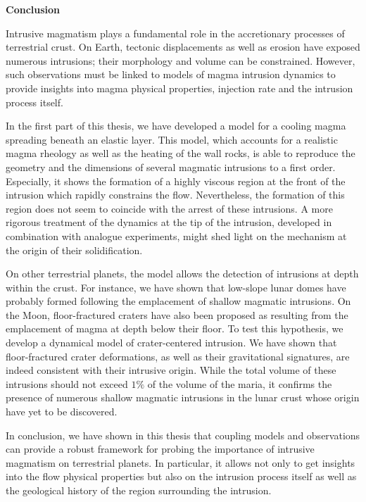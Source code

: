 \thispagestyle{plain}
\begin{center}
 \Large \vspace{.5cm} \textbf{Conclusion}
\end{center}

Intrusive  magmatism  plays a  fundamental  role  in the  accretionary
processes of  terrestrial crust.  On Earth,  tectonic displacements as
well as erosion have exposed numerous intrusions; their morphology and
volume can be constrained.  However,  such observations must be linked
to models of  magma intrusion dynamics to provide  insights into magma
physical properties, injection rate and the intrusion process itself.

In the  first part  of this thesis,  we have developed  a model  for a
cooling magma spreading  beneath an elastic layer.   This model, which
accounts for a realistic magma rheology  as well as the heating of the
wall rocks,  is able to reproduce  the geometry and the  dimensions of
several magmatic  intrusions to a  first order.  Especially,  it shows
the formation of a highly viscous region at the front of the intrusion
which  rapidly constrains  the flow.   Nevertheless, the  formation of
this  region does  not  seem  to coincide  with  the  arrest of  these
intrusions.  A more  rigorous treatment of the dynamics at  the tip of
the  intrusion, developed  in combination  with analogue  experiments,
might  shed   light  on   the  mechanism  at   the  origin   of  their
solidification.

On  other  terrestrial planets,  the  model  allows the  detection  of
intrusions at  depth within  the crust.  For  instance, we  have shown
that  low-slope  lunar  domes   have  probably  formed  following  the
emplacement   of   shallow   magmatic  intrusions.    On   the   Moon,
floor-fractured craters have also been  proposed as resulting from the
emplacement  of  magma at  depth  below  their  floor.  To  test  this
hypothesis, we develop a dynamical model of crater-centered intrusion.
We have  shown that  floor-fractured crater  deformations, as  well as
their  gravitational  signatures,  are indeed  consistent  with  their
intrusive origin.  While  the total volume of  these intrusions should
not exceed $1\%$ of the volume  of the maria, it confirms the presence
of  numerous shallow  magmatic  intrusions in  the  lunar crust  whose
origin have yet to be discovered.

In conclusion, we  have shown in this thesis that  coupling models and
observations can provide a robust framework for probing the importance
of  intrusive magmatism  on  terrestrial planets.   In particular,  it
allows not only to get insights  into the flow physical properties but
also on the intrusion process itself as well as the geological history
of the region surrounding the intrusion.


\clearpage

